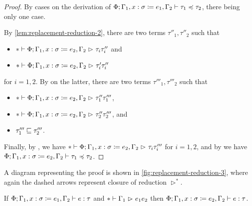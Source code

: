 \begin{proof}
By cases on the derivation of
$\subtype{\Phi; \Gamma_1, \define{x}{\sigma}{e_1}, \Gamma_2}{\tau_1}{\tau_2}$,
there being only one case.
\begin{mathpar}
\end{mathpar}
By \cref{lem:replacement-reduction-2}, there are two terms $\tau''_1, \tau''_2$ such that
\begin{itemize}[noitemsep]
  \item $\red*{\Phi; \Gamma_1, \define{x}{\sigma}{e_2}, \Gamma_2}{\tau_i}{\tau''_i}$ and
  \item $\red*{\Phi; \Gamma_1, \define{x}{\sigma}{e_2}, \Gamma_2}{\tau'_i}{\tau''_i}$
\end{itemize}
for $i = 1, 2$.
By  on the latter, there are two terms $\tau'''_1, \tau'''_2$ such that
\begin{itemize}[noitemsep]
  \item $\red*{\Phi; \Gamma_1, \define{x}{\sigma}{e_2}, \Gamma_2}{\tau''_1}{\tau'''_1}$,
  \item $\red*{\Phi; \Gamma_1, \define{x}{\sigma}{e_2}, \Gamma_2}{\tau''_2}{\tau'''_2}$, and
  \item $\acum{\tau'''_1}{\tau'''_2}$.
\end{itemize}
Finally, by , we have
$\red*{\Phi; \Gamma_1, \define{x}{\sigma}{e_2}, \Gamma_2}{\tau_i}{\tau'''_i}$
for $i = 1, 2$,
and by  we have
$\subtype{\Phi; \Gamma_1, \define{x}{\sigma}{e_2}, \Gamma_2}{\tau_1}{\tau_2}$.
\end{proof}

A diagram representing the proof is shown in \cref{fig:replacement-reduction-3},
where again the dashed arrows represent closure of reduction $\rhd^*$.

\begin{lemma} \label{lem:replacement-reduction}
If $\type{\Phi; \Gamma_1, \define{x}{\sigma}{e_1}, \Gamma_2}{e}{\tau}$
and $\red*{\Gamma_1}{e_1}{e_2}$
then $\type{\Phi; \Gamma_1, \define{x}{\sigma}{e_2}, \Gamma_2}{e}{\tau}$.
\end{lemma}

